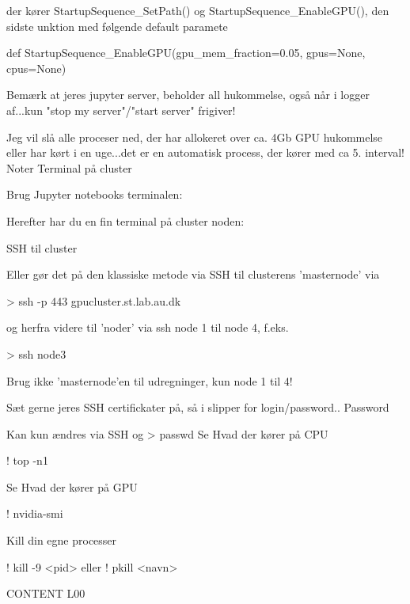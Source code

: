 der kører StartupSequence_SetPath() og StartupSequence_EnableGPU(), den sidste unktion med følgende default paramete

def StartupSequence_EnableGPU(gpu_mem_fraction=0.05, gpus=None, cpus=None)

Bemærk at jeres jupyter server, beholder all hukommelse, også når i logger af...kun "stop my server"/"start server" frigiver!

Jeg vil slå alle proceser ned, der har allokeret over ca. 4Gb GPU hukommelse eller har kørt i en uge...det er en automatisk process, der kører med ca 5. interval!
Noter
Terminal på cluster

Brug Jupyter notebooks terminalen:

Herefter har du en fin terminal på cluster noden:

SSH til cluster

Eller gør det på den klassiske metode via SSH til clusterens 'masternode' via

> ssh -p 443 gpucluster.st.lab.au.dk

og herfra videre til 'noder' via ssh node 1 til node 4, f.eks.

> ssh node3

Brug ikke 'masternode'en til udregninger, kun node 1 til 4!

Sæt gerne jeres SSH certifickater på, så i slipper for login/password..
Password

Kan kun ændres via SSH og > passwd
Se Hvad der kører på CPU

! top -n1

Se Hvad der kører på GPU

! nvidia-smi

Kill din egne processer

! kill -9 <pid>
eller 
! pkill <navn>

CONTENT L00






